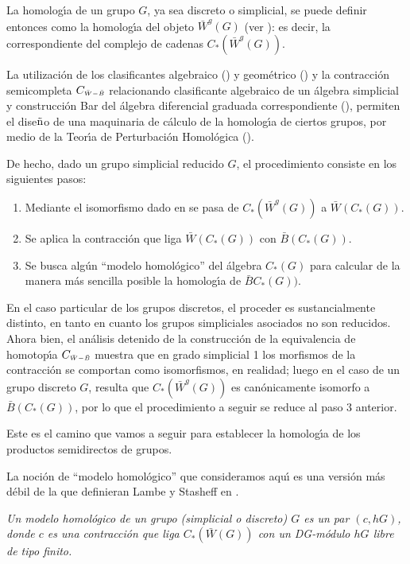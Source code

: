 La homolog\'{\i}a de un grupo $G$, ya sea discreto o simplicial,
se puede definir entonces como la homolog\'{\i}a del objeto
$\bar{W}^g(G)$ (ver \cite{Bro82}): es decir, la correspondiente
del complejo de cadenas $C_*(\bar{W}^g(G))$.

La utilizaci\'{o}n de los clasificantes algebraico (\cite{GM74MAMS}) y
geom\'{e}trico (\cite{May67}) y la contracci\'{o}n semicompleta
$C_{\scriptscriptstyle \bar{W}-\bar{B}}$ relacionando
clasificante algebraico de un \'{a}lgebra simplicial y construcci\'{o}n Bar
del \'{a}lgebra diferencial graduada correspondiente
(\cite{Rea95,RS94,AAR99}), permiten el dise${\tilde{\mbox{n}}}$o de una maquinaria de
c\'{a}lculo de la homolog\'{\i}a de ciertos grupos, por medio de la
Teor\'{\i}a de Perturbaci\'{o}n Homol\'{o}gica (\cite{GL89,GLS90,
GLS91,Shi61,Bro64,Gug60}).

De hecho, dado un grupo simplicial reducido $G$, el procedimiento
consiste en los siguientes pasos:
\begin{enumerate}
\item Mediante el isomorfismo dado en \cite{GM74MAMS} se
pasa de $C_*(\bar{W}^g(G))$ a $\bar{W}(C_*(G))$.
\item Se aplica la contracci\'{o}n que liga $\bar{W}(C_*(G))$ con
$\bar{B}(C_*(G))$.
\item Se busca alg\'{u}n ``modelo homol\'{o}gico'' del \'{a}lgebra $C_*(G)$
para calcular de la manera m\'{a}s sencilla posible la
homolog\'{\i}a de $\bar{B}C_*(G))$.
\end{enumerate}

En el caso particular de los grupos discretos, el proceder es
sustancialmente distinto, en tanto en cuanto los grupos
simpliciales asociados no son reducidos. Ahora bien, el an\'{a}lisis
detenido de la construcci\'{o}n de la equivalencia de homotop\'{\i}a
$C_{\scriptscriptstyle \bar{W}-\bar{B}}$ muestra que en grado simplicial 1 los
morfismos de la contracci\'{o}n se comportan como isomorfismos, en
realidad; luego en el caso de un grupo discreto $G$, resulta que
$C_*(\bar{W}^g(G))$ es can\'{o}nicamente isomorfo a
$\bar{B}(C_*(G))$, por lo que el procedimiento a seguir se reduce
al paso 3 anterior.

Este es el camino que vamos a seguir para establecer la
homolog\'{\i}a de los productos semidirectos de grupos.

La noci\'{o}n de ``modelo homol\'{o}gico'' que consideramos aqu\'{\i}
es una versi\'{o}n m\'{a}s d\'{e}bil de la que definieran Lambe y
Stasheff en \cite{LS87}.

\begin{dfn}
{\em Un {\em modelo homol\'{o}gico} de un grupo (simplicial o
discreto) $G$ es un par $(c,hG)$, donde $c$ es una contracci\'{o}n
que liga $C_*(\bar{W}(G))$ con un DG-m\'{o}dulo $hG$ libre de tipo
finito.}
\end{dfn}

